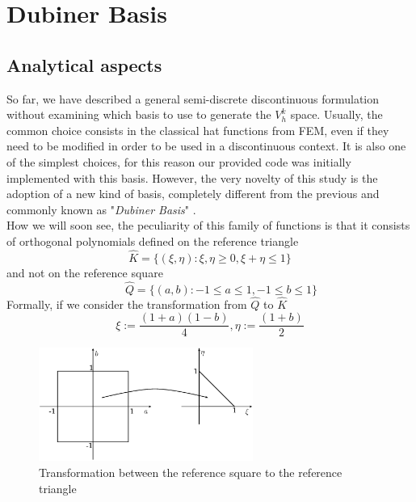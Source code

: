\documentclass[a4paper,11pt]{article}
\begin{document}
\section{Dubiner Basis}
    \subsection{Analytical aspects}\label{analytical_aspects}
    So far, we have described a general semi-discrete discontinuous formulation without examining which basis to use to generate the $V_h^k$ space. Usually, the common choice consists in the classical hat functions from FEM, even if they need to be modified in order to be used in a discontinuous context. It is also one of the simplest choices, for this reason our provided code was initially implemented with this basis. However, the very novelty of this study is the adoption of a new kind of basis, completely different from the previous and commonly known as "\emph{Dubiner Basis}" \cite{dubiner}. \\
    How we will soon see, the peculiarity of this family of functions is that it consists of orthogonal polynomials defined on the reference triangle
    \begin{equation}
    \hat{K}=\{ (\xi, \eta) : \xi, \eta \ge 0,	\xi+\eta \le 1 \}
    \end{equation}
    and not on the reference square
    \begin{equation}
    \quad \quad \hat{Q}=\{ (a, b) : -1 \le a \le 1, -1 \le b \le 1 \}
    \end{equation}
    Formally, if we consider the transformation from $\hat{Q}$ to $\hat{K}$
    \begin{equation}\label{transformation_formula}
    \xi:=\frac{(1+a)(1-b)}{4},  \eta:=\frac{(1+b)}{2}
    \end{equation}
    
    \begin{figure}[h]
    \begin{center}
    \includegraphics[width = 7cm]{./transformation.png}
    	\caption{Transformation between the reference square to the reference triangle}
    	\label{transformation}
    \end{center}
    \end{figure}
    
\end{document}
